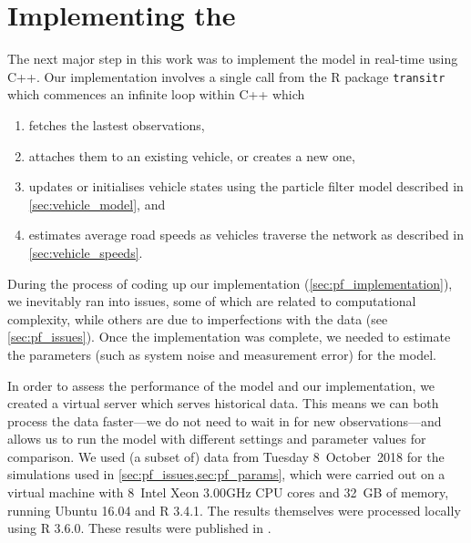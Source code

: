 \section{Implementing the \rt{} \pf{}}
\label{sec:particle-filter}


The next major step in this work was to implement the model in real-time using C++. Our implementation involves a single call from the R package \verb+transitr+ which commences an infinite loop within C++ which
\begin{enumerate}
\item fetches the lastest observations,
\item attaches them to an existing vehicle, or creates a new one,
\item updates or initialises vehicle states using the particle filter model described in \cref{sec:vehicle_model}, and
\item estimates average road speeds as vehicles traverse the network as described in \cref{sec:vehicle_speeds}.
\end{enumerate}
During the process of coding up our implementation (\cref{sec:pf_implementation}), we inevitably ran into issues, some of which are related to computational complexity, while others are due to imperfections with the data (see \cref{sec:pf_issues}). Once the implementation was complete, we needed to estimate the parameters (such as system noise and measurement error) for the model.


In order to assess the \rt{} performance of the model and our \pf{} implementation, we created a virtual \rt{} server which serves historical data. This means we can both process the data faster---we do not need to wait in \rt{} for new observations---and allows us to run the model with different settings and parameter values for comparison. We used (a subset of) data from Tuesday 8~October~2018 for the simulations used in \cref{sec:pf_issues,sec:pf_params}, which were carried out on a virtual machine with 8~Intel Xeon 3.00GHz CPU cores and 32~GB of memory, running Ubuntu 16.04 and R 3.4.1. The results themselves were processed locally using R 3.6.0. These results were published in \citet{Elliott_2020}.









